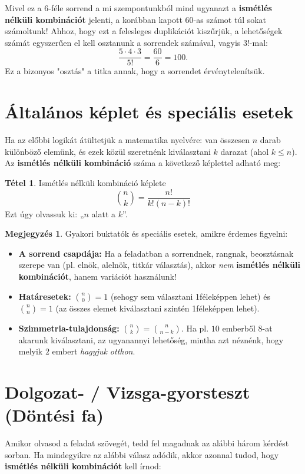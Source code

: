 \documentclass[a4paper,12pt]{article}
\theoremstyle{definition} %
\newtheorem*{theorem}{Tétel}
\newtheorem*{remark}{\mytriangle{bvred} Megjegyzés}
\begin{document}
Mivel ez a $6$-féle sorrend a mi szempontunkból mind ugyanazt a \textbf{ismétlés nélküli kombinációt} jelenti, a korábban kapott $60$-as számot túl sokat számoltunk! Ahhoz, hogy ezt a felesleges duplikációt kiszűrjük, a lehetőségek számát egyszerűen el kell osztanunk a sorrendek számával, vagyis $3!$-mal:
$$\frac{5 \cdot 4 \cdot 3}{5!} = \frac{60}{6} = 100.$$
Ez a bizonyos "osztás" a titka annak, hogy a sorrendet érvénytelenítsük.

\section{Általános képlet és speciális esetek}
Ha az előbbi logikát átültetjük a matematika nyelvére: van összesen $n$ darab különböző elemünk, és ezek közül szeretnénk kiválasztani $k$ darazat (ahol $k \le n$). Az \textbf{ismétlés nélküli kombináció} száma a következő képlettel adható meg:

\begin{theorem}{Ismétlés nélküli kombináció képlete}
$$\binom{n}{k} = \frac{n!}{k!(n-k)!}$$
Ezt úgy olvassuk ki: „$n$ alatt a $k$”.
\end{theorem}

\begin{remark}
Gyakori buktatók és speciális esetek, amikre érdemes figyelni:
\begin{itemize}
    \item \textbf{A sorrend csapdája:} Ha a feladatban a sorrendnek, rangnak, beosztásnak szerepe van (pl. elnök, alelnök, titkár választás), akkor \textit{nem} \textbf{ismétlés nélküli kombinációt}, hanem variációt használunk!
    \item \textbf{Határesetek:} $\binom{n}{0} = 1$ (sehogy sem választani 1féleképpen lehet) és $\binom{n}{n} = 1$ (az összes elemet kiválasztani szintén 1féleképpen lehet).
    \item \textbf{Szimmetria-tulajdonság:} $\binom{n}{k} = \binom{n}{n-k}$. Ha pl. $10$ emberből $8$-at akarunk kiválasztani, az ugyanannyi lehetőség, mintha azt néznénk, hogy melyik $2$ embert \textit{hagyjuk otthon}.
\end{itemize}
\end{remark}

\section{Dolgozat- / Vizsga-gyorsteszt (Döntési fa)}
Amikor olvasod a feladat szövegét, tedd fel magadnak az alábbi három kérdést sorban. Ha mindegyikre az alábbi válasz adódik, akkor azonnal tudod, hogy \textbf{ismétlés nélküli kombinációt} kell írnod:
\end{document}
